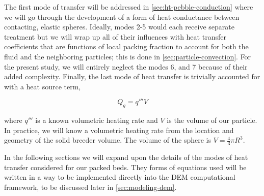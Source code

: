 The first mode of transfer will be addressed in \cref{sec:ht-pebble-conduction} where we will go through the development of a form of heat conductance between contacting, elastic spheres. Ideally, modes 2-5 would each receive separate treatment but we will wrap up all of their influences with heat transfer coefficients that are functions of local packing fraction to account for both the fluid and the neighboring particles; this is done in \cref{sec:particle-convection}. For the present study, we will entirely neglect the modes 6, and 7 because of their added complexity. Finally, the last mode of heat transfer is trivially accounted for with a heat source term,

\begin{equation}\label{eq:nuclear-heating-term}
	Q_g = q'''V
\end{equation}

where $q'''$ is a known volumetric heating rate and $V$ is the volume of our particle. In practice, we will know a volumetric heating rate from the location and geometry of the solid breeder volume. The volume of the sphere is $V = \frac{4}{3}\pi R^3$.

In the following sections we will expand upon the details of the modes of heat transfer considered for our packed beds. They forms of equations used will be written in a way to be implemented directly into the DEM computational framework, to be discussed later in \cref{sec:modeling-dem}.








